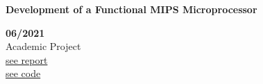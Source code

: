 \begin{minipage}{0.8\textwidth}
    \parbox{0.8\linewidth}{\textbf{Development of a Functional MIPS Microprocessor}} \hfill \textbf{06/2021}\\
    Academic Project\\
    \href{https://github.com/JavierOramas/MIPS-Micro/blob/master/informe.pdf}{see report}\\
    \href{https://github.com/JavierOramas/MIPS-Micro}{see code}\\
    \end{minipage} \hfill {}\\\\